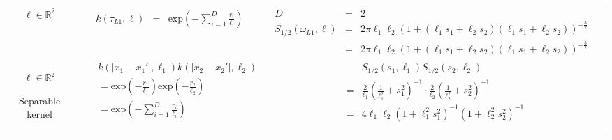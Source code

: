 \documentclass[onecolumn,a4paper,11pt]{article}
\begin{document}
\begin{landscape}
\begin{table}[H]
\begin{center}
\begin{tabular}{|c|c|c|c|}
       \multicolumn{1}{|p{1.5cm}|}{
       \vspace{1mm}
       $\bm{\ell} \in \mathbb{R}^2$
       }
       
         & \multicolumn{1}{|p{5.7cm}|}{\small
         \begin{eqnarray*}
		k(\tau_{L1},\bm{\ell}) &=& \mathrm{exp}\left(- \sum_{i=1}^{D}\frac{r_i}{\ell_i} \right)
         \end{eqnarray*}
       }
       
       & \multicolumn{1}{|p{9.7cm}|}{\small
         \begin{eqnarray*}
         D &=& 2\\
		S_{1/2}(\omega_{L1},\bm{\ell}) &=& 2\pi\ell_1\ell_2 \left(1+(\ell_1 s_{1}+\ell_2 s_{2})(\ell_1 s_{1}+\ell_2 s_{2})\right)^{-\frac{3}{2}} \\
		&=& 2\pi\ell_1\ell_2 \left( 1+ (\ell_1 s_{1}+\ell_2 s_{2})(\ell_1 s_{1}+\ell_2 s_{2}) \right)^{-\frac{3}{2}}
         \end{eqnarray*}
       }
       
       & \multicolumn{1}{|p{5.7cm}|}{\small

       } \\  
       
       \cline{1-3}
       
       \multicolumn{1}{|p{1.5cm}|}{
       \vspace{1mm}
       $\bm{\ell} \in \mathbb{R}^2$
       
       {Separable kernel} 
       }
       
        & \multicolumn{1}{|p{5.7cm}|}{\small
         \begin{eqnarray*}
		&&k(|x_1-x_1'|,\ell_1)k(|x_2-x_2'|,\ell_2) \\
		&&= \mathrm{exp}\left(- \frac{r_1}{\ell_1} \right) \mathrm{exp}\left(- \frac{r_2}{\ell_2} \right) \\
		&&= \mathrm{exp}\left(- \sum_{i=1}^{D}\frac{r_i}{\ell_i} \right)
         \end{eqnarray*}
       }
       
       & \multicolumn{1}{|p{9.7cm}|}{\small
         \begin{eqnarray*}
         &&S_{1/2}(s_1,\ell_1)S_{1/2}(s_2,\ell_2) \\
		&=& \frac{2}{\ell_1}\left(\frac{1}{\ell_1^2}+s_1^2 \right)^{-1} \cdot \frac{2}{\ell_2}\left(\frac{1}{\ell_2^2}+s_2^2 \right)^{-1} \\
		&=& 4\ell_1\ell_2\left(1+\ell_1^2s_1^2 \right)^{-1} \left(1+\ell_2^2s_2^2 \right)^{-1} \\
         \end{eqnarray*}      
       } 


\end{tabular}
\end{center}
\end{table}
\end{landscape}
\end{document}
